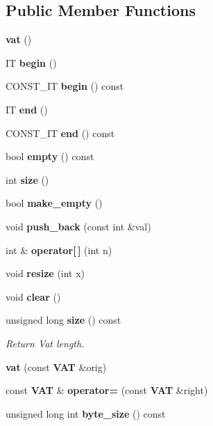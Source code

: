 \subsection*{Public Member Functions}
\begin{CompactItemize}
\item 
{\bf vat} ()\label{classvat_3_01ISET__PROP_00_01V__Fkk__MINE__PROP_00_01ST_01_4_a0}

\item 
IT {\bf begin} ()\label{classvat_3_01ISET__PROP_00_01V__Fkk__MINE__PROP_00_01ST_01_4_a1}

\item 
CONST\_\-IT {\bf begin} () const \label{classvat_3_01ISET__PROP_00_01V__Fkk__MINE__PROP_00_01ST_01_4_a2}

\item 
IT {\bf end} ()\label{classvat_3_01ISET__PROP_00_01V__Fkk__MINE__PROP_00_01ST_01_4_a3}

\item 
CONST\_\-IT {\bf end} () const \label{classvat_3_01ISET__PROP_00_01V__Fkk__MINE__PROP_00_01ST_01_4_a4}

\item 
bool {\bf empty} () const \label{classvat_3_01ISET__PROP_00_01V__Fkk__MINE__PROP_00_01ST_01_4_a5}

\item 
int {\bf size} ()\label{classvat_3_01ISET__PROP_00_01V__Fkk__MINE__PROP_00_01ST_01_4_a6}

\item 
bool {\bf make\_\-empty} ()\label{classvat_3_01ISET__PROP_00_01V__Fkk__MINE__PROP_00_01ST_01_4_a7}

\item 
void {\bf push\_\-back} (const  int \&val)
\item 
int \& {\bf operator[$\,$]} (int n)
\item 
void {\bf resize} (int x)\label{classvat_3_01ISET__PROP_00_01V__Fkk__MINE__PROP_00_01ST_01_4_a10}

\item 
void {\bf clear} ()\label{classvat_3_01ISET__PROP_00_01V__Fkk__MINE__PROP_00_01ST_01_4_a11}

\item 
unsigned long {\bf size} () const \label{classvat_3_01ISET__PROP_00_01V__Fkk__MINE__PROP_00_01ST_01_4_a12}

\begin{CompactList}\small\item\em Return Vat length. \item\end{CompactList}\item 
{\bf vat} (const  {\bf VAT} \&orig)\label{classvat_3_01ISET__PROP_00_01V__Fkk__MINE__PROP_00_01ST_01_4_a13}

\item 
const  {\bf VAT} \& {\bf operator=} (const  {\bf VAT} \&right)\label{classvat_3_01ISET__PROP_00_01V__Fkk__MINE__PROP_00_01ST_01_4_a15}

\item 
unsigned long int {\bf byte\_\-size} () const \label{classvat_3_01ISET__PROP_00_01V__Fkk__MINE__PROP_00_01ST_01_4_a16}

\end{CompactItemize}
